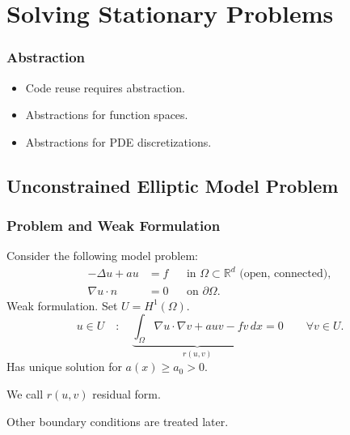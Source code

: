 \section{Solving Stationary Problems}\label{Sec:EllipticProblems}

\begin{frame}
\frametitle<presentation>{Abstraction}
\begin{itemize}
\item Code reuse requires abstraction.
\item Abstractions for function spaces.
\item Abstractions for PDE discretizations.
\end{itemize}
\end{frame}

\subsection{Unconstrained Elliptic Model Problem}

\begin{frame}
\frametitle{Problem and Weak Formulation}
Consider the following model problem:
\begin{subequations} \label{Eq:Example01}
\begin{align*}
-\Delta u + a u &= f &&\text{in $\Omega\subset\mathbb{R}^d$ (open, connected)},\\
\nabla u \cdot n &= 0 &&\text{on $\partial\Omega$}.
\end{align*}
\end{subequations}
\medskip
Weak formulation. Set $U = H^1(\Omega)$.
\begin{equation*}
u\in U \quad : \quad \underbrace{\int_\Omega \nabla u \cdot \nabla v + 
a u v - f v \,dx}_{r(u,v)} = 0 \qquad \forall v\in U.
\end{equation*}
Has unique solution for $a(x)\geq a_0>0$.

We call $r(u,v)$ residual form.

Other boundary conditions are treated later.
\end{frame}

